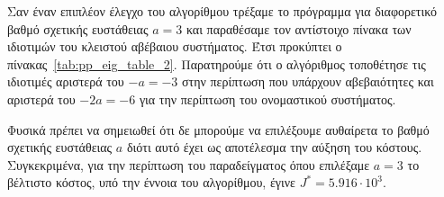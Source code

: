 Σαν έναν επιπλέον έλεγχο του αλγορίθμου τρέξαμε το πρόγραμμα για διαφορετικό βαθμό
σχετικής ευστάθειας \( a = 3 \) και παραθέσαμε τον αντίστοιχο πίνακα των
ιδιοτιμών του κλειστού αβέβαιου συστήματος. Έτσι προκύπτει ο
πίνακας~\ref{tab:pp_eig_table_2}. Παρατηρούμε ότι ο αλγόριθμος τοποθέτησε τις
ιδιοτιμές αριστερά του \( -a = -3 \) στην περίπτωση που υπάρχουν αβεβαιότητες
και αριστερά του \( -2a = -6 \) για την περίπτωση του ονομαστικού συστήματος.
\begin{table}[h]
    \centering
    \eng{\[
            \begin{tabu}{ c | c | c | c | c | c | c}
                {} & r_1 = r_2 = 0 & r_1 = r_2 = -1 & r_1 = r_2 = 1
                & r_1 = 1, r_2 = -1 & r_1 = 0, r_2 = -1 & r_1 = 1, r_2 = 0 \\
                \hline
                \lambda_1 & -6.6622 & -3.6898 & -3.3941 & -3.5145 & -3.5998 & -4.1965 \\
                \lambda_2 & -7 & -3.6898 & -6.6996 & -3.5145 & -3.5998 & -4.1965 \\
                \lambda_3 & -8.1358 & -11.4138 & -6.6996 & -11.7642 & -11.5938 & -9.4002 \\
            \end{tabu}
    \]}
    \label{tab:pp_eig_table_2}
\end{table}
\begin{table}[h]
    \centering
    \eng{\[
            \begin{tabu}{ c | c | c | c | c | c | c}
                {} & r_1 = r_2 = 0 & r_1 = r_2 = -1 & r_1 = r_2 = 1
                & r_1 = 1, r_2 = -1 & r_1 = 0, r_2 = -1 & r_1 = 1, r_2 = 0 \\
                \hline
                \lambda_1 & -20.6622 & -14.497 & -15.7631 & -14.4131 & -14.4548
                & -15.5262 \\
                \lambda_2 & -21      & -14.497 & -20.2793 & -14.4131 & -14.4548
                & -15.5262 \\
                \lambda_3 & -22.1358 & -33.8695 & -24.821 & -34.0372 & -33.9538
                & -30.8111 \\
            \end{tabu}
    \]}
    \label{tab:pp_eig_table_3}
\end{table}
Φυσικά πρέπει να σημειωθεί ότι δε μπορούμε να επιλέξουμε αυθαίρετα το βαθμό
σχετικής ευστάθειας \( a \) διότι αυτό έχει ως αποτέλεσμα την αύξηση του
κόστους. Συγκεκριμένα, για την περίπτωση του παραδείγματος όπου επιλέξαμε \( a
= 3 \) το βέλτιστο κόστος, υπό την έννοια του αλγορίθμου, έγινε \( J^* =
5.916 \cdot 10^3 \).

